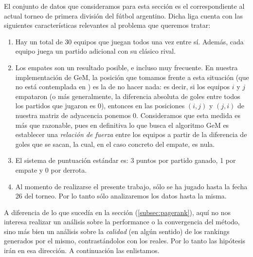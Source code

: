 \label{subsec:ligas}
El conjunto de datos que consideramos para esta sección es el correspondiente al actual torneo de primera división del fútbol argentino. Dicha liga cuenta con las siguientes características relevantes al problema que queremos tratar:
\begin{enumerate}
	\item Hay un total de 30 equipos que juegan todos una vez entre sí. Además, cada equipo juega un partido adicional con su clásico rival.
	\item Los empates son un resultado posible, e incluso muy frecuente. En nuestra implementación de GeM, la posición que tomamos frente a esta situación (que no está contemplada en \cite{Govan2008}) es la de no hacer nada: es decir, si los equipos $i$ y $j$ empataron (o más generalmente, la diferencia absoluta de goles entre todos los partidos que jugaron es 0), entonces en las posiciones $(i,j)$ y $(j,i)$ de nuestra matriz de adyacencia ponemos 0. Consideramos que esta medida es más que razonable, pues en definitiva lo que busca el algoritmo GeM es establecer una \emph{relación de fuerza} entre los equipos a partir de la diferencia de goles que se sacan, la cual, en el caso concreto del empate, es nula. 
	\item El sistema de puntuación estándar es: 3 puntos por partido ganado, 1 por empate y 0 por derrota.
	\item Al momento de realizarse el presente trabajo, sólo se ha jugado hasta la fecha 26 del torneo. Por lo tanto sólo analizaremos los datos hasta la misma. 
\end{enumerate} 

A diferencia de lo que sucedía en la sección (\ref{subsec:pagerank}), aquí no nos interesa realizar un análisis sobre la performance o la convergencia del método, sino más bien un análisis sobre la \emph{calidad} (en algún sentido) de los rankings generados por el mismo, contrastándolos con los reales. Por lo tanto las hipótesis irán en esa dirección. A continuación las enlistamos.


